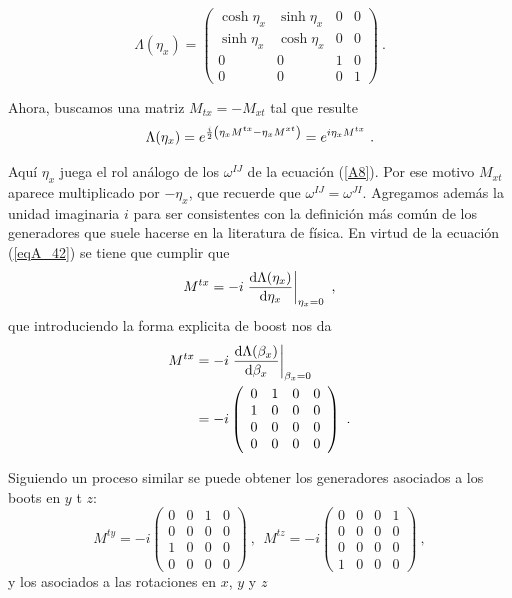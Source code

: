 \begin{equation}
\Lambda \left( \eta _{x}\right) =\left( 
\begin{array}{cccc}
\cosh \eta _{x} & \sinh \eta _{x} & 0 & 0 \\ 
\sinh \eta _{x} & \cosh \eta _{x} & 0 & 0 \\ 
0 & 0 & 1 & 0 \\ 
0 & 0 & 0 & 1
\end{array}
\right)~. 
\end{equation}

Ahora, buscamos una matriz $M_{tx}=-M_{xt}$ tal que resulte
\begin{equation}
    \Lambda \qty(\eta_{x}) = e ^ {\frac{i}{2} \qty(\eta_{x}M^{tx}-\eta_{x}M^{xt})}  = e^{i\eta_{x}M^{tx}}~.
    \label{eqA_42}
\end{equation}

Aquí $\eta_{x}$ juega el rol análogo de los $\omega^{IJ}$ de la ecuación (\ref{A8}). Por ese motivo $M_{xt}$ aparece multiplicado por $-\eta_{x}$, que recuerde que $\omega^{IJ}=\omega^{JI}$. Agregamos además la unidad imaginaria $i$ para ser consistentes con la definición más común de los generadores que suele hacerse en la literatura de física. En virtud de la ecuación (\ref{eqA_42}) se tiene que cumplir que 
\begin{equation}
    M^{tx} = -i \eval{\dv{\Lambda (\eta_{x})}{\eta_{x}}}_{\eta_{x} = 0}~, 
\end{equation}
que introduciendo la forma explicita de boost nos da
\begin{equation}
\begin{split}
    M^{tx} &= -i \eval{\dv{\Lambda (\beta_{x})}{\beta_{x}}}_{\beta_{x} = 0} \\
    &= -i\left(  \begin{array}{cccc}
    0 & 1 & 0 & 0 \\ 
    1 & 0 & 0 & 0 \\ 
    0 & 0 & 0 & 0 \\ 
    0 & 0 & 0 & 0 
    \end{array} \right) ~.
\end{split}
\end{equation}

Siguiendo un proceso similar se puede obtener los generadores asociados a los boots en $y$ t $z$:
\begin{equation}
    M^{ty}=-i\left(  \begin{array}{cccc} 
    0 & 0 & 1 & 0 \\ 
    0 & 0 & 0 & 0 \\ 
    1 & 0 & 0 & 0 \\ 
    0 & 0 & 0 & 0 
    \end{array} \right) ~,~\ M^{tz}=-i\left( \begin{array}{cccc}
    0 & 0 & 0 & 1 \\ 
    0 & 0 & 0 & 0 \\ 
    0 & 0 & 0 & 0 \\ 
    1 & 0 & 0 & 0
    \end{array}
\right) ~,
\end{equation}
 y los asociados a las rotaciones en $x$, $y$ y $z$

